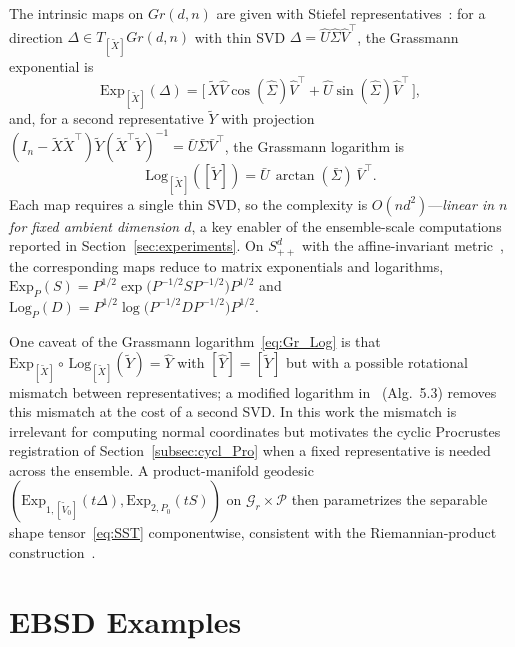 \documentclass[pdflatex,iicol]{sn-jnl}%
\theoremstyle{thmstyleone}%
\theoremstyle{thmstyletwo}%
\theoremstyle{thmstylethree}%
\begin{document}
\begin{appendices}
The intrinsic maps on $Gr(d,n)$ are given with Stiefel representatives~\cite{edelman1998geometry,bendokat2020grassmann}: for a direction $\Delta \in T_{[\widetilde{X}]}Gr(d,n)$ with thin SVD $\Delta = \widehat{U}\widehat{\Sigma}\widehat{V}^{\top}$, the Grassmann exponential is
\begin{equation}\label{eq:Gr_Exp}
    \mathrm{Exp}_{[\widetilde{X}]}(\Delta) = \big[\,\widetilde{X}\widehat{V}\cos(\widehat{\Sigma})\widehat{V}^{\top} + \widehat{U}\sin(\widehat{\Sigma})\widehat{V}^{\top}\,\big],
\end{equation}
and, for a second representative $\widetilde{Y}$ with projection $(I_n - \widetilde{X}\widetilde{X}^{\top})\widetilde{Y}(\widetilde{X}^{\top}\widetilde{Y})^{-1} = \bar U \bar\Sigma \bar V^{\top}$, the Grassmann logarithm is
\begin{equation}\label{eq:Gr_Log}
    \mathrm{Log}_{[\widetilde{X}]}([\widetilde{Y}]) = \bar U\,\arctan(\bar\Sigma)\,\bar V^{\top}.
\end{equation}
Each map requires a single thin SVD, so the complexity is $O(nd^2)$---\emph{linear in $n$ for fixed ambient dimension $d$}, a key enabler of the ensemble-scale computations reported in Section~\ref{sec:experiments}. On $S^d_{++}$ with the affine-invariant metric~\cite{fletcher2003statistics,pennec2020manifold}, the corresponding maps reduce to matrix exponentials and logarithms, $\mathrm{Exp}_P(S) = P^{1/2}\exp\!\big(P^{-1/2}SP^{-1/2}\big)P^{1/2}$ and $ \mathrm{Log}_P(D) = P^{1/2}\log\!\big(P^{-1/2}DP^{-1/2}\big)P^{1/2}$.

One caveat of the Grassmann logarithm~\eqref{eq:Gr_Log} is that $\mathrm{Exp}_{[\widetilde{X}]}\!\circ\,\mathrm{Log}_{[\widetilde{X}]}(\widetilde{Y}) = \widehat{Y}$ with $[\widehat{Y}]=[\widetilde{Y}]$ but with a possible rotational mismatch between representatives; a modified logarithm in~\cite{bendokat2020grassmann} (Alg.~5.3) removes this mismatch at the cost of a second SVD. In this work the mismatch is irrelevant for computing normal coordinates but motivates the cyclic Procrustes registration of Section~\ref{subsec:cycl_Pro} when a fixed representative is needed across the ensemble. A product-manifold geodesic $(\mathrm{Exp}_{1,[\widetilde{V}_0]}(t\Delta),\mathrm{Exp}_{2,P_0}(tS))$ on $\mathcal{G}_r\times\mathcal{P}$ then parametrizes the separable shape tensor~\eqref{eq:SST} componentwise, consistent with the Riemannian-product construction~\cite{grey2023separable}.

\section{EBSD Examples}\label{secA1}


\end{appendices}
\end{document}
